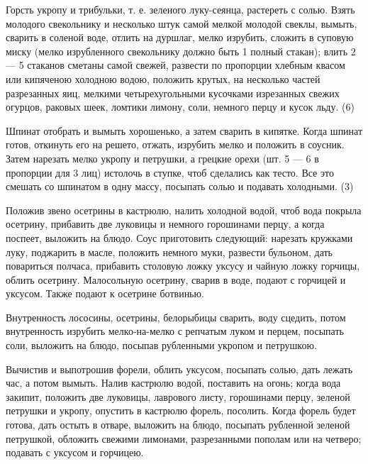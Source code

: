 
Горсть укропу и трибульки, т. е. зеленого луку-сеянца, растереть с солью. Взять молодого свекольнику и несколько штук самой мелкой молодой свеклы, вымыть, сварить в соленой воде, отлить на дуршлаг, мелко изрубить, сложить в суповую миску (мелко изрубленного свекольнику должно быть 1 полный стакан); влить 2 — 5 стаканов сметаны самой свежей, развести по пропорции хлебным квасом или кипяченою холодною водою, положить крутых, на несколько частей разрезанных яиц, мелкими четырехугольными кусочками изрезанных свежих огурцов, раковых шеек, ломтики лимону, соли, немного перцу и кусок льду. (6)


Шпинат отобрать и вымыть хорошенько, а затем сварить в кипятке. Когда шпинат готов, откинуть его на решето, отжать, изрубить мелко и положить в соусник.
Затем нарезать мелко укропу и петрушки, а грецкие орехи (шт. 5 — 6 в пропорции для 3 лиц) истолочь в ступке, чтоб сделались как тесто. Все это смешать со шпинатом в одну массу, посыпать солью и подавать холодными. (3)


Положив звено осетрины в кастрюлю, налить холодной водой, чтоб вода покрыла осетрину, прибавить две луковицы и немного горошинами перцу, а когда поспеет, выложить на блюдо. Соус приготовить следующий: нарезать кружками луку, поджарить в масле, положить немного муки, развести бульоном, дать повариться полчаса, прибавить столовую ложку уксусу и чайную ложку горчицы, облить осетрину. Малосольную осетрину, сварив в воде, подают с горчицей и уксусом. Также подают к осетрине ботвинью.


Внутренность лососины, осетрины, белорыбицы сварить, воду сцедить, потом внутренность изрубить мелко-на-мелко с репчатым луком и перцем, посыпать соли, выложить на блюдо, посыпав рубленными укропом и петрушкою.


Вычистив и выпотрошив форели, облить уксусом, посыпать солью, дать лежать час, а потом вымыть. Налив кастрюлю водой, поставить на огонь; когда вода закипит, положить две луковицы, лаврового листу, горошинами перцу, зеленой петрушки и укропу, опустить в кастрюлю форель, посолить. Когда форель будет готова, дать остыть в отваре, выложить на блюдо, посыпать рубленной зеленой петрушкой, обложить свежими лимонами, разрезанными пополам или на четверо; подавать с уксусом и горчицею.


